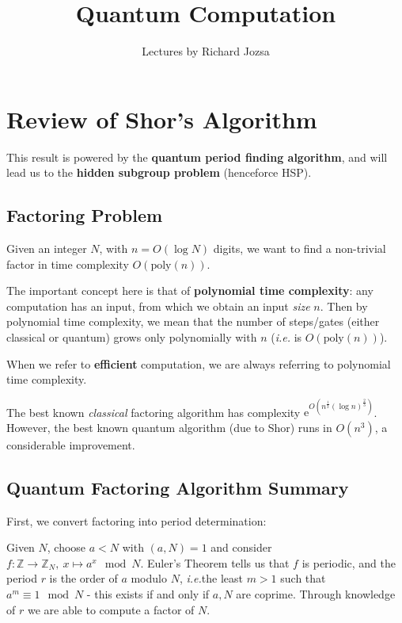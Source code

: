 \documentclass[]{article}
\title{Quantum Computation}
\author{Lectures by Richard Jozsa}
\date{}
\theoremstyle{custhm}
\theoremstyle{cusdef}
\theoremstyle{custhm}
\theoremstyle{remark}
\newcommand{\Z}{\mathbb{Z}}
\newcommand{\e}{\mathrm{e}}
\newcommand{\ra}{\rightarrow}
\newcommand{\lef}{\left(}
\newcommand{\res}{\right)}
\newcommand{\ie}{\textit{i.e.}}
\begin{document}
\maketitle

\tableofcontents
\clearpage
\section{Review of Shor's Algorithm}

This result is powered by the \textbf{quantum period finding algorithm}, and will lead us to the \textbf{hidden subgroup problem} (henceforce HSP).

\subsection{Factoring Problem}

Given an integer $N$, with $n = O(\log N)$ digits, we want to find a non-trivial factor in time complexity $O(\textrm{poly}(n))$.

The important concept here is that of \textbf{polynomial time complexity}: any computation has an input, from which we obtain an input \textit{size} $n$. Then by polynomial time complexity, we mean that the number of steps/gates (either classical or quantum) grows only polynomially with $n$ (\textit{i.e.} is $O(\textrm{poly}(n))$).

When we refer to \textbf{efficient} computation, we are always referring to polynomial time complexity.

The best known \textit{classical} factoring algorithm has complexity $\e^{O\lef n^{\frac{1}{3}}(\log n)^{\frac{2}{3}}\res}$. However, the best known quantum algorithm (due to Shor) runs in $O(n^3)$, a considerable improvement.

\subsection{Quantum Factoring Algorithm Summary}

First, we convert factoring into period determination:

Given $N$, choose $a<N$ with $(a,N) = 1$ and consider $f:\Z \ra \Z_N,\ x\mapsto a^x \mod N$. Euler's Theorem tells us that $f$ is periodic, and the period $r$ is the order of $a$ modulo $N$, \ie the least $m > 1$ such that $a^m \equiv 1 \mod N$ - this exists if and only if $a,N$ are coprime. Through knowledge of $r$ we are able to compute a factor of $N$.
\end{document}
